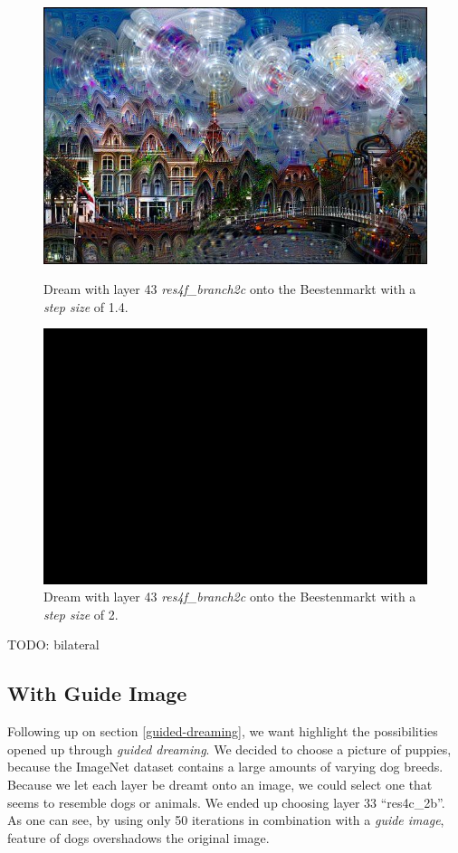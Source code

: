 \begin{figure}[H]
	\centering
	\includegraphics[width=1\linewidth]{img/houses1.jpg}
	\caption{Dream with layer 43 \emph{res4f\_branch2c} onto the Beestenmarkt with a \emph{step size} of 1.4.}
	\label{fig:houses1}
	\endminipage\hfill
	\centering
	\includegraphics[width=1\linewidth]{img/houses2.jpg}
	\caption{Dream with layer 43 \emph{res4f\_branch2c} onto the Beestenmarkt with a \emph{step size} of 2.}
	\label{fig:houses2}
	\endminipage\hfill
\end{figure}

TODO: bilateral


\subsection{With Guide Image}
\label{sec:withguide}
Following up on section \ref{guided-dreaming}, we want highlight the possibilities opened up through \textit{guided dreaming}.
We decided to choose a picture of puppies, because the ImageNet dataset contains a large amounts of varying dog breeds.
Because we let each layer be dreamt onto an image, we could select one that seems to resemble dogs or animals.
We ended up choosing layer 33 \enquote{res4c\_2b}.
As one can see, by using only 50 iterations in combination with a \textit{guide image}, feature of dogs overshadows the original image.

